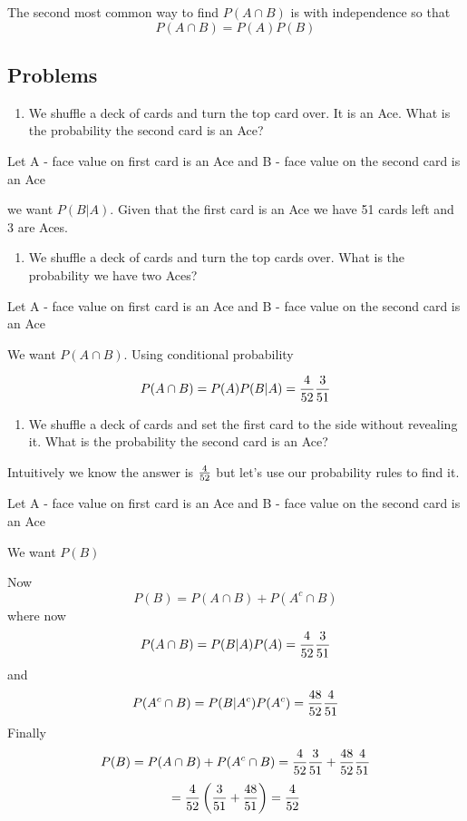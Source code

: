 \documentclass[]{book}
\providecommand{\tightlist}{%
  \setlength{\itemsep}{0pt}\setlength{\parskip}{0pt}}
\theoremstyle{definition}
\theoremstyle{definition}
\theoremstyle{definition}
\theoremstyle{remark}
\begin{document}
The second most common way to find \(P(A \cap B)\) is with independence
so that \[P(A \cap B)=P(A)P(B)\]

\subsection{Problems}\label{problems}

\begin{enumerate}
\def\labelenumi{\arabic{enumi}.}
\tightlist
\item
  We shuffle a deck of cards and turn the top card over. It is an Ace.
  What is the probability the second card is an Ace?
\end{enumerate}

Let A - face value on first card is an Ace and B - face value on the
second card is an Ace

we want \(P(B|A)\). Given that the first card is an Ace we have 51 cards
left and 3 are Aces.

\begin{enumerate}
\def\labelenumi{\arabic{enumi}.}
\setcounter{enumi}{1}
\tightlist
\item
  We shuffle a deck of cards and turn the top cards over. What is the
  probability we have two Aces?
\end{enumerate}

Let A - face value on first card is an Ace and B - face value on the
second card is an Ace

We want \(P(A \cap B)\). Using conditional probability

\[P(A \cap B) =P(A)P(B|A)={4 \over 52}{3 \over 51}\]

\begin{enumerate}
\def\labelenumi{\arabic{enumi}.}
\setcounter{enumi}{2}
\tightlist
\item
  We shuffle a deck of cards and set the first card to the side without
  revealing it. What is the probability the second card is an Ace?
\end{enumerate}

Intuitively we know the answer is \({4 \over 52}\) but let's use our
probability rules to find it.

Let A - face value on first card is an Ace and B - face value on the
second card is an Ace

We want \(P(B)\)

Now \[P(B)=P(A \cap B)+P(A^c \cap B)\] where now
\[P(A \cap B)=P(B|A)P(A)={4 \over 52}{3 \over 51}\] and
\[P(A^c \cap B)=P(B|A^c)P(A^c)={48 \over 52}{4 \over 51}\] Finally
\[P(B)=P(A \cap B)+P(A^c \cap B)={4 \over 52}{3 \over 51}+{48 \over 52}{4 \over 51}\]
\[={4 \over 52}\left({3 \over 51}+{48 \over 51}\right)={4 \over 52}\]
\end{document}
